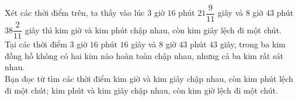 \begin{bt}
{	Xét các thời điểm trên, ta thấy vào lúc $3$ giờ $16$ phút $21 \dfrac{9}{11}$ giây và $8$ giờ $43$ phút $38\dfrac{2}{11}$ giây thì kim giờ và kim phút chập nhau, còn kim giây lệch đi một chút.\\
	Tại các thời điểm $3$ giờ $16$ phút $16$ giây và $8$ giờ $43$ phút $43$ giây, trong ba kim đồng hồ không có hai kim nào hoàn toàn chập nhau, nhưng cả ba kim rất sát nhau. \\
	Bạn đọc từ tìm các thời điểm kim giờ và kim giây chập nhau, còn kim phút lệch đi một chút; kim phút và kim giây chập nhau, còn kim giờ lệch đi một chút.	
	}
\end{bt}
